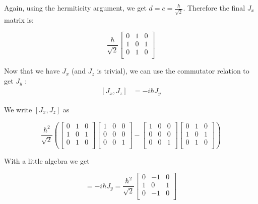 Again, using the hermiticity argument, we get $d = c = \frac{\hbar}{\sqrt{2}}$. Therefore the final $J_x$ matrix is:

\begin{equation}
    \frac{\hbar}{\sqrt{2}}
    \begin{bmatrix}
    0 & 1 & 0 \\
    1 & 0 & 1 \\
    0 & 1 & 0 \\
    \end{bmatrix}
\end{equation}

Now that we have $J_x$ (and $J_z$ is trivial), we can use the commutator relation to get $J_y$ :
\begin{equation}
\begin{split}
    [J_x,J_z] &= -i \hbar J_y  
\end{split}
\end{equation}

We write $[J_x,J_z]$ as

\begin{equation}
    \frac{\hbar^2}{\sqrt{2}}(
    \begin{bmatrix}
    0 & 1 & 0 \\
    1 & 0 & 1 \\
    0 & 1 & 0 \\
    \end{bmatrix}
    \begin{bmatrix}
    1 & 0 & 0 \\
    0 & 0 & 0 \\
    0 & 0 & 1 \\
    \end{bmatrix} 
    -
    \begin{bmatrix}
    1 & 0 & 0 \\
    0 & 0 & 0 \\
    0 & 0 & 1 \\
    \end{bmatrix}
    \begin{bmatrix}
    0 & 1 & 0 \\
    1 & 0 & 1 \\
    0 & 1 & 0 \\
    \end{bmatrix})
\end{equation}

With a little algebra we get 

\begin{equation}
    [J_x,J_z] = -i \hbar J_y  = \frac{\hbar^2}{\sqrt{2}}
        \begin{bmatrix}
    0 & -1 & 0 \\
    1 & 0 & 1 \\
    0 & -1 & 0 \\
    \end{bmatrix}
\end{equation}

